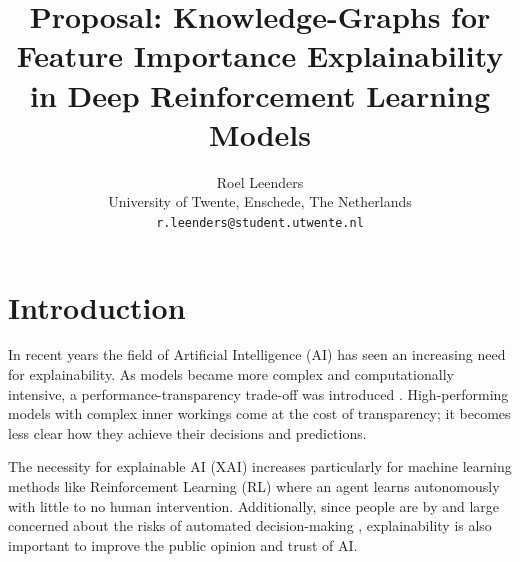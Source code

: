 \documentclass[11pt]{article}
\title{Proposal: Knowledge-Graphs for Feature Importance Explainability in Deep Reinforcement Learning Models}
\author{Roel Leenders \\
  University of Twente, Enschede, The Netherlands \\
  \texttt{r.leenders@student.utwente.nl}}
\begin{document}
\maketitle
\section{Introduction}


In recent years the field of Artificial Intelligence (AI) has seen an increasing need for explainability. As models became more 
complex and computationally intensive, a performance-transparency trade-off was introduced \cite{Puiutta2020}. High-performing 
models with complex inner workings come at the cost of transparency; it becomes less clear how they achieve their decisions and 
predictions. 

The necessity for explainable AI (XAI) increases particularly for machine learning methods like Reinforcement Learning (RL)
where an agent learns autonomously with little to no human intervention. Additionally, since people are by and large concerned
about the risks of automated decision-making \cite{Araujo2020}, explainability is also important to improve the public opinion and trust of AI.

\end{document}
